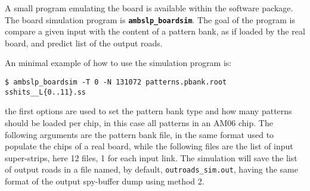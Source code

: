 \label{sec:boardsim}
A small program emulating the board is available within the software
package. The board simulation program is 
\textbf{\texttt{ambslp\_boardsim}}. 
The goal of the program 
is compare a given input with the content of a pattern bank, as if loaded
by the real board, and predict list of the output roads.

An minimal example of how to use the simulation program is:
\begin{verbatim}
$ ambslp_boardsim -T 0 -N 131072 patterns.pbank.root sshits__L{0..11}.ss
\end{verbatim}
the first options are used to set the pattern bank type and how many
patterns should be loaded per chip, in this case all patterns in an AM06 chip.
The following arguments are the pattern bank file, in the same format
used to populate the chips of a real board, while the following files are
the list of input super-strips, here 12 files, 1 for each input link.
The simulation will save the list of output roads in a file named, by default,
\texttt{outroads\_sim.out}, having the same format of the output 
spy-buffer dump using method 2.